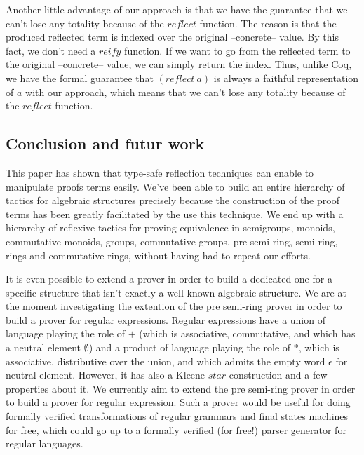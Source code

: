 Another little advantage of our approach is that we have the guarantee that we can't lose any totality because of the $reflect$ function. The reason is that the produced reflected term is indexed over the original --concrete-- value. By this fact, we don't need a $reify$ function. If we want to go from the reflected term to the original --concrete-- value, we can simply return the index. Thus, unlike Coq, we have the formal guarantee that $(reflect\ a)$ is always a faithful representation of $a$ with our approach, which means that we can't lose any totality because of the $reflect$ function.


	\subsection {Conclusion and futur work}
	
This paper has shown that type-safe reflection techniques can enable to manipulate proofs terms easily. We've been able to build an entire hierarchy of tactics for algebraic structures precisely because the construction of the proof terms has been greatly facilitated by the use this technique. We end up with a hierarchy of reflexive tactics for proving equivalence in semigroups, monoids, commutative monoids, groups, commutative groups, pre semi-ring, semi-ring, rings and commutative rings, without having had to repeat our efforts.

It is even possible to extend a prover in order to build a dedicated one for a specific structure that isn't exactly a well known algebraic structure. We are at the moment investigating the extention of the pre semi-ring prover in order to build a prover for regular expressions. Regular expressions have a union of language playing the role of $+$ (which is associative, commutative, and which has a neutral element $\emptyset$) and a product of language playing the role of $*$, which is associative, distributive over the union, and which admits the empty word $\epsilon$ for neutral element. However, it has also a Kleene $star$ construction and a few properties about it. We currently aim to extend the pre semi-ring prover in order to build a prover for regular expression. Such a prover would be useful for doing formally verified transformations of regular grammars and final states machines for free, which could go up to a formally verified (for free!) parser generator for regular languages.



